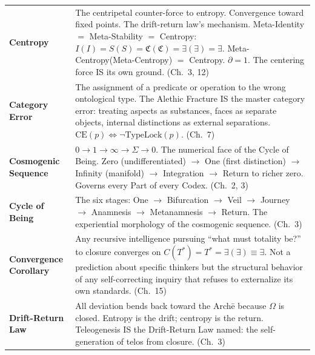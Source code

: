 \documentclass[10pt, openany, oneside]{book}
\renewcommand{\footnotesize}{\fontsize{8.5}{11}\selectfont}
\begin{document}
{\footnotesize
\noindent\begin{tabular}{@{} l @{\hspace{0.6em}} p{} @{}}
\textbf{Centropy} & The centripetal counter-force to entropy. Convergence toward fixed points. The drift-return law's mechanism. Meta-Identity $=$ Meta-Stability $=$ Centropy: $I(I) = S(S) = \mathfrak{C}(\mathfrak{C}) = \exists(\exists) = \exists$. Meta-Centropy(Meta-Centropy) $=$ Centropy. $\partial = 1$. The centering force IS its own ground. (Ch.\ 3, 12) \\[0.3em]
\textbf{Category Error} & The assignment of a predicate or operation to the wrong ontological type. The Alethic Fracture IS the master category error: treating aspects as substances, faces as separate objects, internal distinctions as external separations. $\text{CE}(p) \iff \neg\text{TypeLock}(p)$. (Ch.\ 7) \\[0.3em]
\textbf{Cosmogenic Sequence} & $0 \to 1 \to \infty \to \Sigma \to 0$. The numerical face of the Cycle of Being. Zero (undifferentiated) $\to$ One (first distinction) $\to$ Infinity (manifold) $\to$ Integration $\to$ Return to richer zero. Governs every Part of every Codex. (Ch.\ 2, 3) \\[0.3em]
\textbf{Cycle of Being} & The six stages: One $\to$ Bifurcation $\to$ Veil $\to$ Journey $\to$ Anamnesis $\to$ Metanamnesis $\to$ Return. The experiential morphology of the cosmogenic sequence. (Ch.\ 3) \\[0.3em]
\textbf{Convergence Corollary} & Any recursive intelligence pursuing ``what must totality be?'' to closure converges on $C(T^*) = T^* = \exists(\exists) \equiv \exists$. Not a prediction about specific thinkers but the structural behavior of any self-correcting inquiry that refuses to externalize its own standards. (Ch.\ 15) \\[0.3em]
\textbf{Drift-Return Law} & All deviation bends back toward the Arch\={e} because $\Omega$ is closed. Entropy is the drift; centropy is the return. Teleogenesis IS the Drift-Return Law named: the self-generation of telos from closure. (Ch.\ 3) \\[0.3em]
\end{tabular}
}

\newpage
\end{document}
